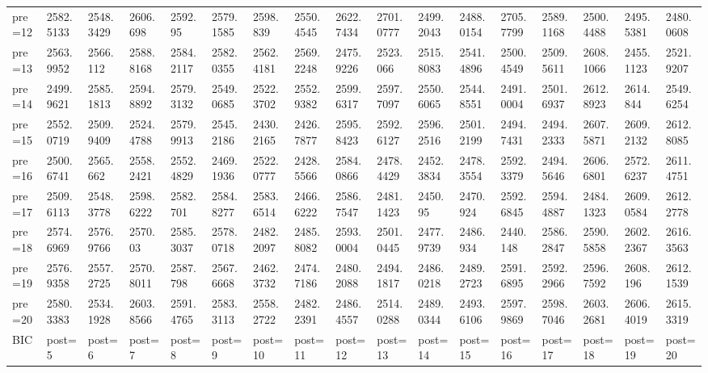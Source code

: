 \documentclass[11pt]{article}
\begin{document}
\begin{tabular}{lllllllllllllllll}
	 pre=12      & 2582.5133   & 2548.3429   & 2606.698    & 2592.95     & 2579.1585   & 2598.839    & 2550.4545   & 2622.7434   & 2701.0777   & 2499.2043   & 2488.0154   & 2705.7799   & 2589.1168   & 2500.4488   & 2495.5381   & 2480.0608  \\
	 pre=13      & 2563.9952   & 2566.112    & 2588.8168   & 2584.2117   & 2582.0355   & 2562.4181   & 2569.2248   & 2475.9226   & 2523.066    & 2515.8083   & 2541.4896   & 2500.4549   & 2509.5611   & 2608.1066   & 2455.1123   & 2521.9207  \\
	 pre=14      & 2499.9621   & 2585.1813   & 2594.8892   & 2579.3132   & 2549.0685   & 2522.3702   & 2552.9382   & 2599.6317   & 2597.7097   & 2550.6065   & 2544.8551   & 2491.0004   & 2501.6937   & 2612.8923   & 2614.844    & 2549.6254  \\
	 pre=15      & 2552.0719   & 2509.9409   & 2524.4788   & 2579.9913   & 2545.2186   & 2430.2165   & 2426.7877   & 2595.8423   & 2592.6127   & 2596.2516   & 2501.2199   & 2494.7431   & 2494.2333   & 2607.5871   & 2609.2132   & 2612.8085  \\
	 pre=16      & 2500.6741   & 2565.662    & 2558.2421   & 2552.4829   & 2469.1936   & 2522.0777   & 2428.5566   & 2584.0866   & 2478.4429   & 2452.3834   & 2478.3554   & 2592.3379   & 2494.5646   & 2606.6801   & 2572.6237   & 2611.4751  \\
	 pre=17      & 2509.6113   & 2548.3778   & 2598.6222   & 2582.701    & 2584.8277   & 2583.6514   & 2466.6222   & 2586.7547   & 2481.1423   & 2450.95     & 2470.924    & 2592.6845   & 2594.4887   & 2484.1323   & 2609.0584   & 2612.2778  \\
	 pre=18      & 2574.6969   & 2576.9766   & 2570.03     & 2585.3037   & 2578.0718   & 2482.2097   & 2485.8082   & 2593.0004   & 2501.0445   & 2477.9739   & 2486.934    & 2440.148    & 2586.2847   & 2590.5858   & 2602.2367   & 2616.3563  \\
	 pre=19      & 2576.9358   & 2557.2725   & 2570.8011   & 2587.798    & 2567.6668   & 2462.3732   & 2474.7186   & 2480.2088   & 2494.1817   & 2486.0218   & 2489.2723   & 2591.6895   & 2592.2966   & 2596.7592   & 2608.196    & 2612.1539  \\
	 pre=20      & 2580.3383   & 2534.1928   & 2603.8566   & 2591.4765   & 2583.3113   & 2558.2722   & 2482.2391   & 2486.4557   & 2514.0288   & 2489.0344   & 2493.6106   & 2597.9869   & 2598.7046   & 2603.2681   & 2606.4019   & 2615.3319  \\
	 BIC         & post=5      & post=6      & post=7      & post=8      & post=9      & post=10     & post=11     & post=12     & post=13     & post=14     & post=15     & post=16     & post=17     & post=18     & post=19     & post=20    \\

\end{tabular}
\end{document}
